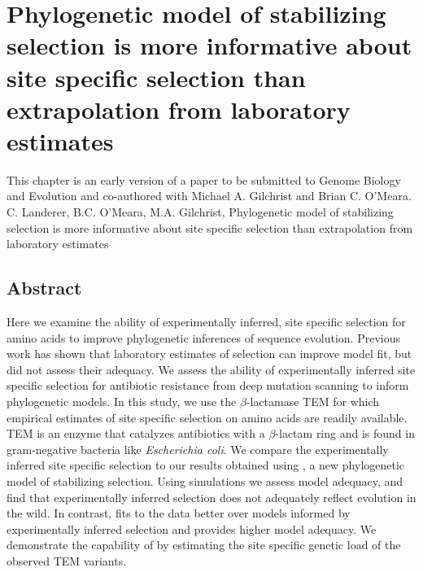 \chapter{Phylogenetic model of stabilizing selection is more informative about site specific selection than extrapolation from laboratory estimates} 
\label{ch:phylogeny}

\clearpage
\pagebreak

This chapter is an early version of a paper to be submitted to Genome Biology and Evolution and co-authored with Michael A. Gilchrist and Brian C. O'Meara.\\
\newline
\newline
C. Landerer, B.C. O'Meara, M.A. Gilchrist, Phylogenetic model of stabilizing selection is more informative about site specific selection than extrapolation from laboratory estimates

\section{Abstract}
Here we examine the ability of experimentally inferred, site specific selection for amino acids to improve phylogenetic inferences of sequence evolution.
Previous work has shown that laboratory estimates of selection can improve model fit, but did not assess their adequacy.
We assess the ability of experimentally inferred site specific selection for antibiotic resistance from deep mutation scanning to inform phylogenetic models.
In this study, we use the $\beta$-lactamase TEM for which empirical estimates of site specific selection on amino acids are readily available.
TEM is an enzyme that catalyzes antibiotics with a $\beta$-lactam ring and is found in gram-negative bacteria like \textit{Escherichia coli}.
We compare the experimentally inferred site specific selection to our results obtained using \selac, a new phylogenetic model of stabilizing selection.
Using simulations we assess model adequacy, and find that experimentally inferred selection does not adequately reflect evolution in the wild.
In contrast, \selac fits to the data better over models informed by experimentally inferred selection and provides higher model adequacy.
We demonstrate the capability of \selac by estimating the site specific genetic load of the observed TEM variants.

\newpage

